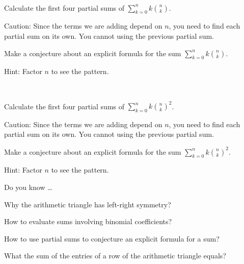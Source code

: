 \begin{exer}[\exerU] %
\label{exer_sums_ktimes_rows_arith_tri}
 ~
     \begin{exerpart}
        \item Calculate the first four partial sums of $\displaystyle \sum_{k=0}^nk\binom{n}{k}$.  
        
        Caution: Since the terms we are adding depend on $n$, you need to find each partial sum on its own.  You cannot using the previous partial sum.
        
        \item Make a conjecture about an explicit formula for the sum $\displaystyle \sum_{k=0}^nk\binom{n}{k}$. 
        
        Hint: Factor $n$ to see the pattern. %
    \end{exerpart}   
\end{exer}

\begin{exer}[\exerU] %
\label{exer_sums_ktimes_sq_rows_arith_tri}
 ~
    \begin{exerpart}
        \item Calculate the first four partial sums of $\displaystyle \sum_{k=0}^nk\binom{n}{k}^2$.  
        
        Caution: Since the terms we are adding depend on $n$, you need to find each partial sum on its own.  You cannot using the previous partial sum.
        
        \item Make a conjecture about an explicit formula for the sum $\displaystyle \sum_{k=0}^nk\binom{n}{k}^2$. 
        
        Hint: Factor $n$ to see the pattern. %
    \end{exerpart}   
\end{exer}

\begin{exer}[\exerR] %
\label{exer_dyk_arith_tri_patterns}
    Do you know \ldots
        \begin{exerpart}
            \item Why the arithmetic triangle has left-right symmetry?
            \item How to evaluate sums involving binomial coefficients?
            \item How to use partial sums to conjecture an explicit formula for a sum?
           \item What the sum of the entries of a row of the arithmetic triangle equals?
        \end{exerpart}
\end{exer}

